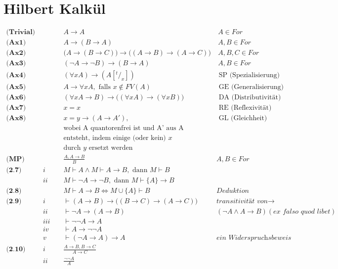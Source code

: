 \documentclass{article}
\begin{document}
	\section{Hilbert Kalk\"ul}
		\begin{align*}
			\textbf{(Trivial) } & & & A \rightarrow A &\ A \in For \\
			\textbf{(Ax1) } & & & A \rightarrow (B \rightarrow A) &\ A, B \in For\\
			\textbf{(Ax2) } & & & \big(A \rightarrow (B \rightarrow C)\big) \rightarrow \big((A \rightarrow B) \rightarrow (A \rightarrow C)\big) &\ A, B, C \in For\\
			\textbf{(Ax3) } & & & (\neg A \rightarrow \neg B ) \rightarrow (B \rightarrow A) &\ A, B \in For\\
			\textbf{(Ax4) } & & & (\forall x A) \rightarrow (A[^t/_x]) & \text{ SP (Spezialisierung)}\\
			\textbf{(Ax5) } & & & A \rightarrow \forall x A, \text{ falls } x \not \in FV(A) & \text{ GE (Generalisierung)}\\
			\textbf{(Ax6) } & & & (\forall x A \rightarrow B) \rightarrow \big( ( \forall x A ) \rightarrow (\forall x B) \big) & \text{ DA (Distributivit\"at)}\\
			\textbf{(Ax7) } & & & x = x & \text{ RE (Reflexivit\"at)}\\
			\textbf{(Ax8) } & & & x = y \rightarrow (A \rightarrow A'), & \text{ GL (Gleichheit)}\\
			& & & \text{wobei A quantorenfrei ist und A' aus A}\\
			& & & \text{entsteht, indem einige (oder kein) } x \\
			& & & \text{durch } y \text{ ersetzt werden }\\
			\textbf{(MP) } & & & \frac{A, A \rightarrow B}{B} & A, B \in For \\
			\textbf{(2.7) } & \textit{i } & & M \vdash A \wedge M \vdash A \rightarrow B, \text{ dann }  M \vdash B\\
			& \textit{ii } & & M \vdash \neg A \rightarrow \neg B, \text{ dann }  M \vdash \{A\} \rightarrow B\\
			\textbf{(2.8) } & & & M \vdash A \rightarrow B \Leftrightarrow M \cup \{A\} \vdash B & \textit{Deduktion}\\
			\textbf{(2.9) } & \textit{i } & & \vdash (A \rightarrow B) \rightarrow \big( ( B \rightarrow C ) \rightarrow (A \rightarrow C) \big) & \textit{transitivit\"at von} \rightarrow\\
			& \textit{ii } & & \vdash \neg A \rightarrow (A \rightarrow B) & (\neg A \wedge A \rightarrow B) (\textit{ex falso quod libet})\\
			& \textit{iii } & & \vdash \neg\neg A \rightarrow A\\
			& \textit{iv } & & \vdash A \rightarrow \neg\neg A\\
			& \textit{v } & & \vdash (\neg A \rightarrow A) \rightarrow A & \textit{ein Widerspruchsbeweis}\\
			\textbf{(2.10) } & \textit{i } & & \frac{A \rightarrow B, B \rightarrow C}{A \rightarrow C}\\
			& \textit{ii } & & \frac{\neg\neg A}{A}\\
		\end{align*}
\end{document}
